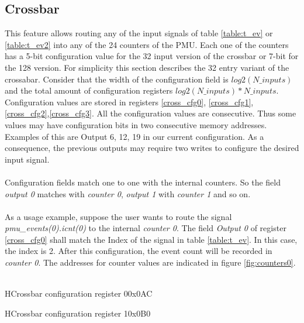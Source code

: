 \subsection{Crossbar}
This feature allows routing any of the input signals of table \ref{table:t_ev} or \ref{table:t_ev2} into any of the 24 counters of the PMU. Each one of the counters has a 5-bit configuration value for the 32 input version of the crossbar or 7-bit for the 128 version. For simplicity this section describes the 32 entry variant of the crossabar. Consider that the width of the configuration field is $log2(N\_inputs)$ and the total amount of configuration registers $log2(N\_inputs)*N\_inputs$.\\
Configuration values are stored in registers \ref{cross_cfg0}, \ref{cross_cfg1}, \ref{cross_cfg2},\ref{cross_cfg3}. All the configuration values are consecutive. Thus some values may have configuration bits in two consecutive memory addresses. Examples of this are Output 6, 12, 19 in our current configuration. As a consequence, the previous outputs may require two writes to configure the desired input signal.\\
\\
Configuration fields match one to one with the internal counters. So the field \textit{output 0} matches with \textit{counter 0}, \textit{output 1} with\textit{ counter 1} and so on.\\
\\
As a usage example, suppose the user wants to route the signal \textit{pmu\_events(0).icnt(0)} to the internal \textit{counter 0}. The field \textit{Output 0} of register \ref{cross_cfg0} shall match the  Index of the signal in table \ref{table:t_ev}. In this case, the index is 2. After this configuration, the event count will be recorded in \textit{counter 0}. The addresses for counter values are indicated in figure \ref{fig:counters0}.\\
\\
 \begin{register}{H}{Crossbar configuration register 0}{0x0AC}
	\label{cross_cfg0}
	\regnewline
	
\end{register}

 \begin{register}{H}{Crossbar configuration register 1}{0x0B0}
	\label{cross_cfg1}
	\regnewline
\end{register}

